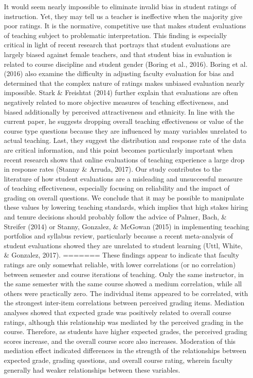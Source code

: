 \documentclass[man]{apa6}
\theoremstyle{definition}
\theoremstyle{definition}
\theoremstyle{definition}
\theoremstyle{remark}
\begin{document}
It would seem nearly impossible to eliminate invalid bias in student
ratings of instruction. Yet, they may tell us a teacher is ineffective
when the majority give poor ratings. It is the normative, competitive
use that makes student evaluations of teaching subject to problematic
interpretation. This finding is especially critical in light of recent
research that portrays that student evaluations are largely biased
against female teachers, and that student bias in evaluation is related
to course discipline and student gender (Boring et al., 2016). Boring et
al. (2016) also examine the difficulty in adjusting faculty evaluation
for bias and determined that the complex nature of ratings makes
unbiased evaluation nearly impossible. Stark \& Freishtat (2014) further
explain that evaluations are often negatively related to more objective
measures of teaching effectiveness, and biased additionally by perceived
attractiveness and ethnicity. In line with the current paper, he
suggests dropping overall teaching effectiveness or value of the course
type questions because they are influenced by many variables unrelated
to actual teaching. Last, they suggest the distribution and response
rate of the data are critical information, and this point becomes
particularly important when recent research shows that online
evaluations of teaching experience a large drop in response rates
(Stanny \& Arruda, 2017). Our study contributes to the literature of how
student evaluations are a misleading and unsuccessful measure of
teaching effectiveness, especially focusing on reliability and the
impact of grading on overall questions. We conclude that it may be
possible to manipulate these values by lowering teaching standards,
which implies that high stakes hiring and tenure decisions should
probably follow the advice of Palmer, Bach, \& Streifer (2014) or
Stanny, Gonzalez, \& McGowan (2015) in implementing teaching portfolios
and syllabus review, particularly because a recent meta-analysis of
student evaluations showed they are unrelated to student learning (Uttl,
White, \& Gonzalez, 2017).
=======
These findings appear to indicate that faculty ratings are only somewhat reliable, with lower correlations (or no correlation) between semester and course iterations of teaching. Only the same instructor, in the same semester with the same course showed a medium correlation, while all others were practically zero. The individual items appeared to be correlated, with the strongest inter-item correlations between perceived grading items. Mediation analyses showed that expected grade was positively related to overall course ratings, although this relationship was mediated by the perceived grading in the course. Therefore, as students have higher expected grades, the perceived grading scores increase, and the overall course score also increases. Moderation of this mediation effect indicated differences in the strength of the relationships between expected grade, grading questions, and overall course rating, wherein faculty generally had weaker relationships between these variables.
\end{document}
